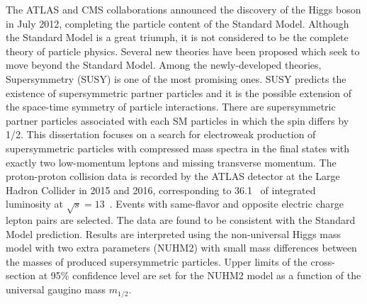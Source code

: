 The ATLAS and CMS collaborations announced the discovery of the Higgs boson in July 2012, completing the particle content of the Standard Model.
Although the Standard Model is a great triumph, it is not considered to be the complete theory of particle physics.
Several new theories have been proposed which seek to move beyond the Standard Model.
Among the newly-developed theories, Supersymmetry (SUSY) is one of the most promising ones.
SUSY predicts the existence of supersymmetric partner particles and it is the possible extension of the space-time symmetry of particle interactions.
There are supersymmetric partner particles associated with each SM particles in which the spin differs by 1/2.
This dissertation focuses on a search for electroweak production of supersymmetric particles with compressed mass spectra in the final states with exactly two low-momentum leptons and missing transverse momentum.
The proton-proton collision data is recorded by the ATLAS detector at the Large Hadron Collider in 2015 and 2016, corresponding to 36.1~{\ifb} of integrated luminosity at $\sqrt{s} = 13$~{\TeV}.
Events with same-flavor and opposite electric charge lepton pairs are selected.
The data are found to be consistent with the Standard Model prediction.
Results are interpreted using the non-universal Higgs mass model with two extra parameters (NUHM2) with small mass differences between the masses of produced supersymmetric particles.
Upper limits of the cross-section at 95\% confidence level are set for the NUHM2 model as a function of the universal gaugino mass $m_{1/2}$.
